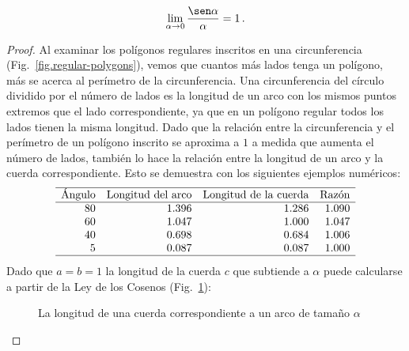 \begin{theorem}\label{thm.limit-sine-over}
\[
\lim_{\alpha\rightarrow 0}\frac{\sen\alpha}{\alpha}=1\,.
\]
\end{theorem}

\begin{proof}
Al examinar los polígonos regulares inscritos en una circunferencia (Fig.~\ref{fig.regular-polygons}), vemos que cuantos más lados tenga un polígono, más se acerca al perímetro de la circunferencia. Una circunferencia del círculo dividido por el número de lados es la longitud de un arco con los mismos puntos extremos que el lado correspondiente, ya que en un polígono regular todos los lados tienen la misma longitud. Dado que la relación entre la circunferencia y el perímetro de un polígono inscrito se aproxima a $1$ a medida que aumenta el número de lados, también lo hace la relación entre la longitud de un arco y la cuerda correspondiente. Esto se demuestra con los siguientes ejemplos numéricos:
\[
\begin{array}{r@{\hspace{10pt}}r@{\hspace{10pt}}r@{\hspace{10pt}}r}
\hline
\textrm{Ángulo} & \textrm{Longitud del arco} & \textrm{Longitud de la cuerda} & \textrm{Razón}\\\hline
80 & 1.396 & 1.286  & 1.090\\
60 & 1.047 & 1.000  & 1.047\\
40 & 0.698 & 0.684 & 1.006\\
5  & 0.087 & 0.087 &1.000 \\\hline
\end{array}
\]
Dado que $a=b=1$ la longitud de la cuerda $c$ que subtiende a $\alpha$ puede calcularse a partir de la Ley de los Cosenos  (Fig.~\ref{fig.length-of-a-chord}):
\begin{figure}[t]
\begin{center}
\caption{La longitud de una cuerda correspondiente a un arco de tamaño $\alpha$}\label{fig.length-of-a-chord}
\end{center}
\end{figure}


\end{proof}
